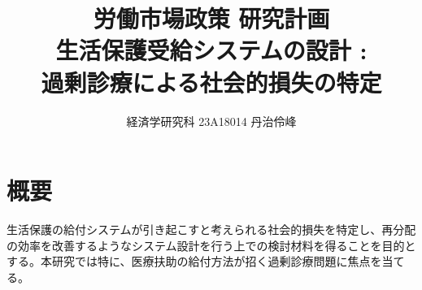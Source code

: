 \documentclass{jsarticle}[12pt]
\begin{document}
\title{労働市場政策 研究計画 \\
生活保護受給システムの設計 : \\ 過剰診療による社会的損失の特定}
\author{経済学研究科 23A18014 丹治伶峰}
\date{}
\maketitle

\large

\section{概要}
\hspace{1zw}生活保護の給付システムが引き起こすと考えられる社会的損失を特定し、再分配の効率を改善するようなシステム設計を行う上での検討材料を得ることを目的とする。本研究では特に、医療扶助の給付方法が招く過剰診療問題に焦点を当てる。
\end{document}
